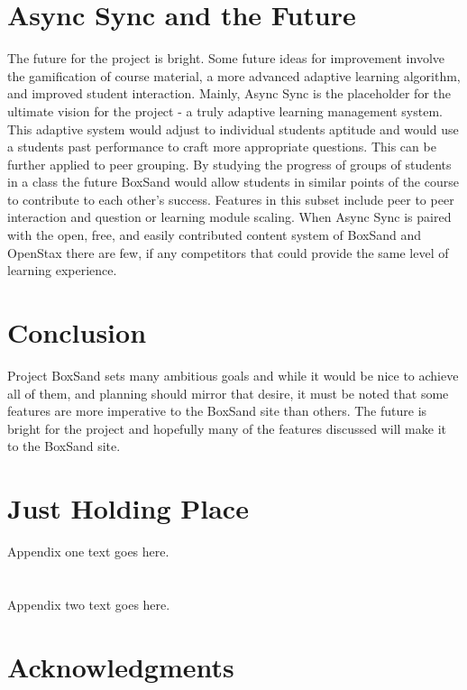 \documentclass[10pt,journal,compsoc,draftclsnofoot,onecolumn]{IEEEtran}
\begin{document}
\section{Async Sync and the Future}
The future for the project is bright. Some future ideas for improvement involve the gamification of course material, a more advanced adaptive learning algorithm, and improved student interaction. Mainly, Async Sync is the placeholder for the ultimate vision for the project - a truly adaptive learning management system. This adaptive system would adjust to individual students aptitude and would use a students past performance to craft more appropriate questions. This can be further applied to peer grouping. By studying the progress of groups of students in a class the future BoxSand would allow students in similar points of the course to contribute to each other's success. Features in this subset include peer to peer interaction and question or learning module scaling. When Async Sync is paired with the open, free, and easily contributed content system of BoxSand and OpenStax there are few, if any competitors that could provide the same level of learning experience.


\section{Conclusion}
Project BoxSand sets many ambitious goals and while it would be nice to achieve all of them, and planning should mirror that desire, it must be noted that some features are more imperative to the BoxSand site than others. The future is bright for the project and hopefully many of the features discussed will make it to the BoxSand site. 

\appendices
\section{Just Holding Place}
Appendix one text goes here.

\section{}
Appendix two text goes here.


\ifCLASSOPTIONcompsoc
  \section*{Acknowledgments}
\else
\end{document}
